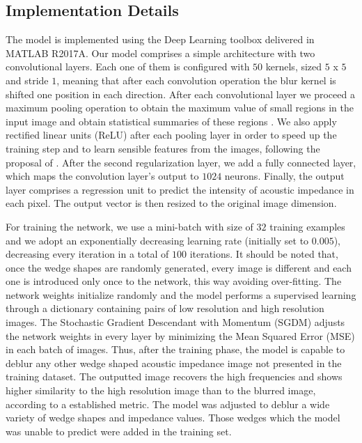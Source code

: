 \documentclass[conference]{IEEEtran}
\begin{document}
\subsection{Implementation Details}
The model is implemented using the Deep Learning toolbox
delivered in MATLAB R2017A. Our model comprises a simple architecture with two convolutional layers.
Each one of them is configured with $50$ kernels, sized $5$ x $5$
and stride $1$, meaning that after each convolution operation the blur kernel is shifted
one position in each direction. After each convolutional layer we proceed a maximum pooling operation
to obtain the maximum value of small regions in the input image and obtain  statistical summaries of these regions . We also
apply rectified linear units (ReLU) after each pooling layer in order to speed up the training
step and to learn sensible features from the images, following the proposal of \cite{Nair2010}. After
the second regularization layer,  we add a fully connected layer, which maps the convolution layer's output
to $1024$ neurons. Finally, the output layer comprises a regression unit to predict the intensity of acoustic impedance in each pixel.
The output vector is then resized to the original image dimension.

For training the network, we use a mini-batch with size of $32$ training examples
and we adopt an exponentially decreasing learning rate (initially
set to $0.005$), decreasing every iteration in a total of $100$ iterations.
It should be noted that, once the wedge shapes are randomly generated, every image is different
and each one is introduced only once to the network, this way avoiding over-fitting.
The network weights initialize randomly and the model performs a supervised learning through a dictionary containing pairs of low resolution and high resolution images.
The Stochastic Gradient Descendant with Momentum (SGDM) \cite{Ning1999} adjusts the network weights in every layer by minimizing the Mean Squared Error (MSE)
in each batch of images. Thus, after the training phase, the model is capable
to deblur any other wedge shaped acoustic impedance image not presented in the training dataset. The outputted
image recovers the high frequencies and shows higher similarity
to the high resolution image than to the blurred image, according to a established metric.
The model was adjusted to deblur a wide variety of wedge shapes and impedance values.
Those wedges which the model was unable to predict were added in the training set.
\end{document}
